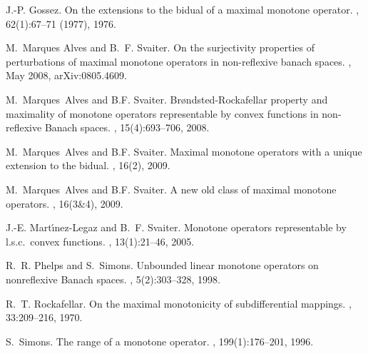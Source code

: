 \documentclass[11pt]{article}
\begin{document}
\begin{thebibliography}{10}
J.-P. Gossez.
\newblock On the extensions to the bidual of a maximal monotone operator.
, 62(1):67--71 (1977), 1976.

M.~{Marques Alves} and B.~F. {Svaiter}.
\newblock On the surjectivity properties of perturbations of maximal monotone
  operators in non-reflexive banach spaces.
, May 2008, arXiv:0805.4609.

M.~Marques~Alves and B.F. Svaiter.
\newblock Br\o ndsted-{R}ockafellar property and maximality of monotone
  operators representable by convex functions in non-reflexive {B}anach spaces.
, 15(4):693--706, 2008.

M.~Marques~Alves and B.F. Svaiter.
\newblock Maximal monotone operators with a unique extension to the bidual.
, 16(2), 2009.

M.~Marques~Alves and B.F. Svaiter.
\newblock A new old class of maximal monotone operators.
, 16(3\&4), 2009.

J.-E. Mart{\'{\i}}nez-Legaz and B.~F. Svaiter.
\newblock Monotone operators representable by l.s.c.\ convex functions.
, 13(1):21--46, 2005.

R.~R. Phelps and S.~Simons.
\newblock Unbounded linear monotone operators on nonreflexive {B}anach spaces.
, 5(2):303--328, 1998.

R.~T. Rockafellar.
\newblock On the maximal monotonicity of subdifferential mappings.
, 33:209--216, 1970.

S.~Simons.
\newblock The range of a monotone operator.
, 199(1):176--201, 1996.

\end{thebibliography}
\end{document}
